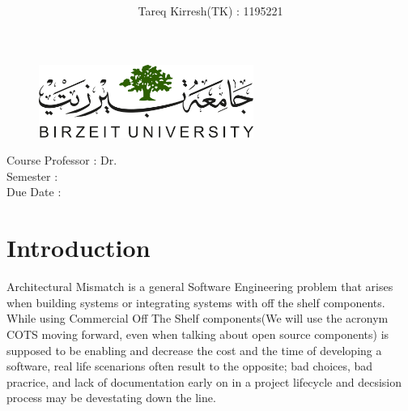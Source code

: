\documentclass[14pt]{article}
\title{\the\course\\\the\assignment}
\author{Tareq Kirresh(TK) : 1195221}
\begin{document}
\begin{figure}
\centering
  \includegraphics[width=7cm]{./images/birzeit-logo.png}
\end{figure}
\maketitle 
\begin{center} 
	Course Professor : Dr. \the\professor\\
    Semester : \the\semester\\
    Due Date : \the\duedate\\
\end{center}
\newpage


\tableofcontents 
\newpage 






\section{Introduction}
Architectural Mismatch is a general Software Engineering problem that arises when 
building systems or integrating systems with off the shelf components. While using
Commercial Off The Shelf components(We will use the acronym COTS moving forward, even when 
talking about open source components) is supposed to be enabling and decrease 
the cost and the time of developing a software, real life scenarions often result
to the opposite; bad choices, bad pracrice, and lack of documentation early on 
in a project lifecycle and decsision process may be devestating down the line.
\end{document}
